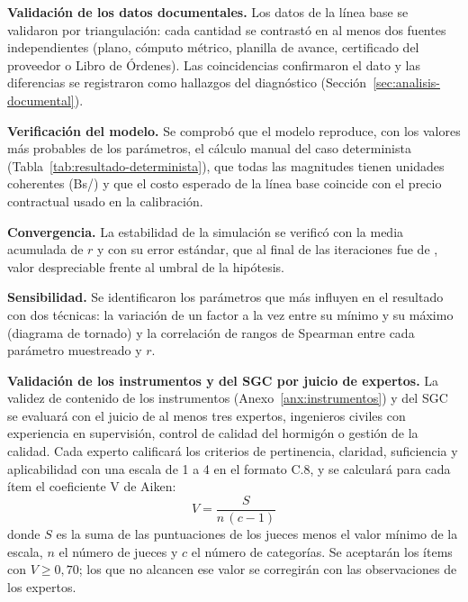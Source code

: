\textbf{Validación de los datos documentales.} Los datos de la línea base se validaron por triangulación: cada cantidad se contrastó en al menos dos fuentes independientes (plano, cómputo métrico, planilla de avance, certificado del proveedor o Libro de Órdenes). Las coincidencias confirmaron el dato y las diferencias se registraron como hallazgos del diagnóstico (Sección~\ref{sec:analisis-documental}).

\textbf{Verificación del modelo.} Se comprobó que el modelo reproduce, con los valores más probables de los parámetros, el cálculo manual del caso determinista (Tabla~\ref{tab:resultado-determinista}), que todas las magnitudes tienen unidades coherentes (Bs/\mdos{}) y que el costo esperado de la línea base coincide con el precio contractual usado en la calibración.

\textbf{Convergencia.} La estabilidad de la simulación se verificó con la media acumulada de $r$ y con su error estándar, que al final de las \MCiter{} iteraciones fue de \SEr{}, valor despreciable frente al umbral de la hipótesis.

\textbf{Sensibilidad.} Se identificaron los parámetros que más influyen en el resultado con dos técnicas: la variación de un factor a la vez entre su mínimo y su máximo (diagrama de tornado) y la correlación de rangos de Spearman entre cada parámetro muestreado y $r$.

\textbf{Validación de los instrumentos y del SGC por juicio de expertos.} La validez de contenido de los instrumentos (Anexo~\ref{anx:instrumentos}) y del SGC se evaluará con el juicio de al menos tres expertos, ingenieros civiles con experiencia en supervisión, control de calidad del hormigón o gestión de la calidad. Cada experto calificará los criterios de pertinencia, claridad, suficiencia y aplicabilidad con una escala de 1 a 4 en el formato C.8, y se calculará para cada ítem el coeficiente V de Aiken:
\begin{equation}
  V = \frac{S}{n\,(c-1)}
  \label{eq:aiken}
\end{equation}
donde $S$ es la suma de las puntuaciones de los jueces menos el valor mínimo de la escala, $n$ el número de jueces y $c$ el número de categorías. Se aceptarán los ítems con $V \geq 0{,}70$; los que no alcancen ese valor se corregirán con las observaciones de los expertos. 

